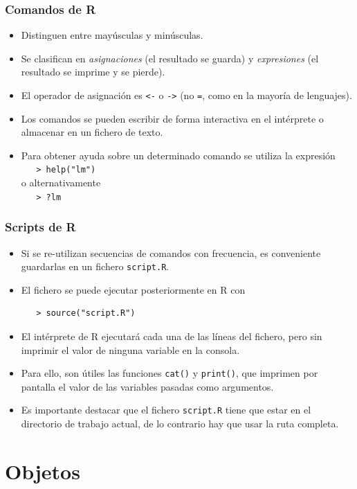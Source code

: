 \documentclass{beamer}
\begin{document}
\begin{frame}[fragile]
\frametitle{Comandos de R}

\begin{itemize}
\item Distinguen entre mayúsculas y minúsculas.
\item Se clasifican en \textit{asignaciones} (el resultado se guarda) y \textit{expresiones} (el resultado se imprime y se pierde).
\item El operador de asignación es \texttt{<-} o \texttt{->} (no \texttt{=}, como en la mayoría de lenguajes).
\item Los comandos se pueden escribir de forma interactiva en el intérprete o almacenar en un fichero de texto.
\item Para obtener ayuda sobre un determinado comando se utiliza la expresión \\ \verb+   > help("lm")+ \\o alternativamente \\ \verb+   > ?lm+
\end{itemize}
\end{frame}

\begin{frame}[fragile]
\frametitle{Scripts de R}
\begin{itemize}
\item Si se re-utilizan secuencias de comandos con frecuencia, es conveniente guardarlas en un fichero \texttt{script.R}.
\item El fichero se puede ejecutar posteriormente en R con
\begin{verbatim}
   > source("script.R")
\end{verbatim}
\item El intérprete de R ejecutará cada una de las líneas del fichero, pero sin imprimir el valor de ninguna variable en la consola.
\item Para ello, son útiles las funciones \texttt{cat()} y \texttt{print()}, que imprimen por pantalla el valor de las variables pasadas como argumentos.
\item Es importante destacar que el fichero \texttt{script.R} tiene que estar en el directorio de trabajo actual, de lo contrario hay que usar la ruta completa.
\end{itemize}
\end{frame}

\section{Objetos}
\end{document}
